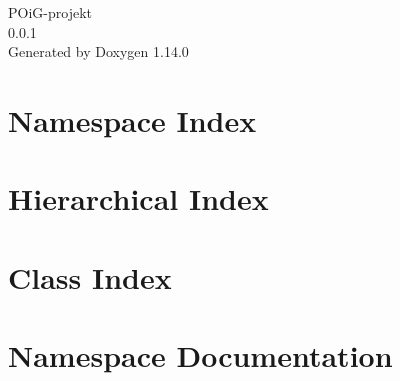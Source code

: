 \documentclass[twoside]{book}
\newcommand{\+}{\discretionary{\mbox{\scriptsize$\hookleftarrow$}}{}{}}
\newcommand{\clearemptydoublepage}{%
    \newpage{\pagestyle{empty}\cleardoublepage}%
  }
\begin{document}
  \raggedbottom
    \hypersetup{pageanchor=false,
                bookmarksnumbered=true,
                pdfencoding=unicode
               }
  \begin{titlepage}
  \vspace*{7cm}
  \begin{center}%
  {\Large POi\+G-\/projekt}\\
  [1ex]\large 0.\+0.\+1 \\
  \vspace*{1cm}
  {\large Generated by Doxygen 1.14.0}\\
  \end{center}
  \end{titlepage}
  \clearemptydoublepage
  \tableofcontents
  \clearemptydoublepage
  \hypersetup{pageanchor=true}
\chapter{Namespace Index}

\chapter{Hierarchical Index}

\chapter{Class Index}

\chapter{Namespace Documentation}








\end{document}
